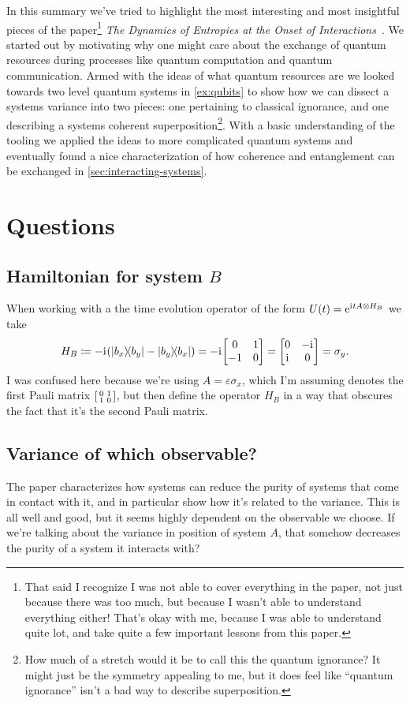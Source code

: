\documentclass[11pt,english]{article}
\theoremstyle{definition}
\newcommand{\iu}{\mathrm{i}\mkern1mu}
\newcommand{\e}{\mathrm{e}}
\begin{document}
In this summary we've tried to highlight the most interesting and most insightful pieces of the paper\footnote{That said I recognize I was not able to cover everything in the paper, not just because there was too much, but because I wasn't able to understand everything either! That's okay with me, because I was able to understand quite lot, and take quite a few important lessons from this paper.} \emph{The Dynamics of Entropies at the Onset of Interactions}~\cite{dynamic-entropies}. We started out by motivating why one might care about the exchange of quantum resources during processes like quantum computation and quantum communication. Armed with the ideas of what quantum resources are we looked towards two level quantum systems in \cref{ex:qubits} to show how we can dissect a systems variance into two pieces: one pertaining to classical ignorance, and one describing a systems coherent superposition\footnote{How much of a stretch would it be to call this the quantum ignorance? It might just be the symmetry appealing to me, but it does feel like ``quantum ignorance'' isn't a bad way to describe superposition.}. With a basic understanding of the tooling we applied the ideas to more complicated quantum systems and eventually found a nice characterization of how coherence and entanglement can be exchanged in \cref{sec:interacting-systems}.

\section{Questions}

\subsection{Hamiltonian for system $B$}
When working with a the time evolution operator of the form $U(t) = \e^{\iu tA\otimes H_B}$ we take
\begin{equation*}
	H_B \coloneqq -\iu\qty(\ketbra{b_x}{b_y} - \ketbra{b_y}{b_x}) = -\iu\mqty[0 & 1 \\ -1 & 0] = \mqty[0 & -\iu \\ \iu & 0] = \sigma_y.
\end{equation*}
I was confused here because we're using $A = \varepsilon\sigma_x$, which I'm assuming denotes the first Pauli matrix $\smqty[0 & 1 \\ 1 & 0]$, but then define the operator $H_B$ in a way that obscures the fact that it's the second Pauli matrix.

\subsection{Variance of which observable?}
The paper characterizes how systems can reduce the purity of systems that come in contact with it, and in particular show how it's related to the variance. This is all well and good, but it seems highly dependent on the observable we choose. If we're talking about the variance in position of system $A$, that somehow decreases the purity of a system it interacts with?
\end{document}
